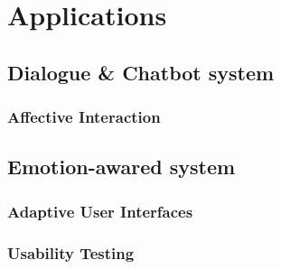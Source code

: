 \section{Applications}\label{sec:applications}

\cite{Picard1999}

\subsection{Dialogue \& Chatbot system}


\subsubsection{Affective Interaction}
\cite{Conati2005, Hutchison2011}


\subsection{Emotion-awared system}


\subsubsection{Adaptive User Interfaces}


\cite{Dalvand, Galindo, Kaiser2006}


\subsubsection{Usability Testing}

